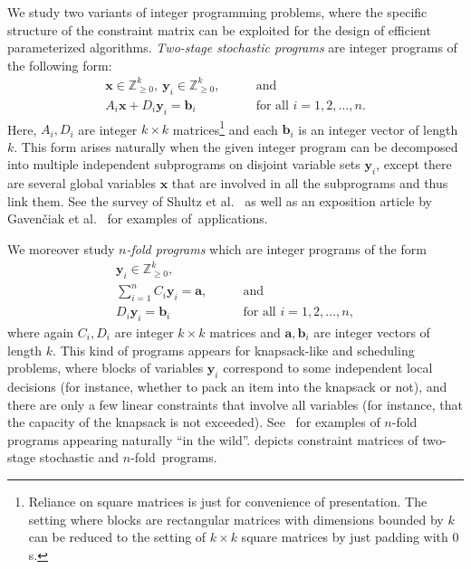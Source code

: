 \documentclass{theoretics}
\renewcommand{\geq}{\geqslant}
\newcommand{\Z}{\mathbb{Z}}
\newcommand{\Zn}{\Z_{\geq 0}}
\newcommand{\tup}[1]{{\mathbf{#1}}}
\newcommand{\xx}{\tup x}
\newcommand{\yy}{\tup y}
\newcommand{\av}{\tup a}
\newcommand{\bb}{\tup b}
\begin{document}
We study two variants of integer programming problems, where the specific structure of the constraint matrix can be exploited for the design of efficient parameterized algorithms. {\em{Two-stage stochastic programs}} are integer programs of the following form:
\begin{align}
 \xx\in \Zn^k,\ \yy_i\in \Zn^k, &\qquad  \textrm{and}\nonumber\\
 A_i\xx + D_i\yy_i =\bb_i &\qquad \textrm{for all }i=1,2,\ldots,n.\tag{$\spadesuit$}\label{eq:twostage-form}
\end{align}
Here, $A_i,D_i$ are integer $k\times k$ matrices\footnote{Reliance on square matrices is just for convenience of presentation. The setting where blocks are rectangular matrices with dimensions bounded by $k$ can be reduced to the setting of $k\times k$ square matrices by just padding with $0$s.} and each $\bb_i$ is an integer vector of length $k$. This form arises naturally when the given integer program can be decomposed into multiple independent subprograms on disjoint variable sets $\yy_i$, except there are several global variables $\xx$ that are involved in all the subprograms and thus link them. See the survey of Shultz et al.~\cite{SchultzSvdV96} as well as an exposition article by Gaven\v{c}iak et al.~\cite{GavenciakKK22} for examples of~applications.

We moreover study {\em{$n$-fold programs}} which are integer programs of the form
\begin{align}
    \yy_i\in \Zn^k, &\nonumber \\
    \sum_{i=1}^n C_i\yy_i = \av,\nonumber & \qquad \textrm{and} \tag{$\clubsuit$}\label{eq:nfold-form}\\
    D_i\yy_i = \bb_i & \qquad \textrm{for all }i=1,2,\ldots,n,\nonumber
\end{align}
where again $C_i,D_i$ are integer $k\times k$ matrices and $\av,\bb_i$ are integer vectors of length $k$. This kind of programs appears for knapsack-like and scheduling problems, where blocks of variables $\yy_i$ correspond to some independent local decisions (for instance, whether to pack an item into the knapsack or not), and there are only a few linear constraints that involve all variables (for instance, that the capacity of the knapsack is not exceeded). See~\cite{ChenMYZ17,DeLoera2008,GavenciakKK22,JansenKMR22,KnopK18,KnopKLMO21,KnopKM20,KnopKM20b} for examples of $n$-fold programs appearing naturally ``in the wild''.  depicts constraint matrices of two-stage stochastic and $n$-fold~programs.
\end{document}
